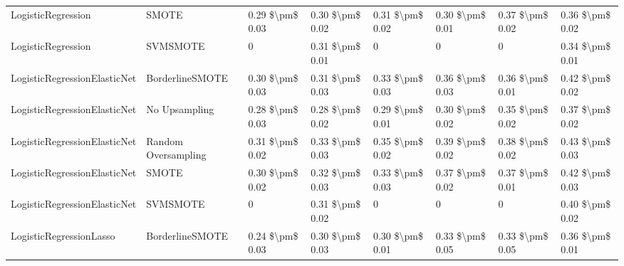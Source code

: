 \begin{tabular}{llllllll}
             LogisticRegression &                         SMOTE & 0.29 \$\textbackslash pm\$ 0.03 &           0.30 \$\textbackslash pm\$ 0.02 &       0.31 \$\textbackslash pm\$ 0.02 &        0.30 \$\textbackslash pm\$ 0.01 &                         0.37 \$\textbackslash pm\$ 0.02 &     0.36 \$\textbackslash pm\$ 0.02 \\
             LogisticRegression &                      SVMSMOTE &               0 &           0.31 \$\textbackslash pm\$ 0.01 &                     0 &                      0 &                                       0 &     0.34 \$\textbackslash pm\$ 0.01 \\
   LogisticRegressionElasticNet &               BorderlineSMOTE & 0.30 \$\textbackslash pm\$ 0.03 &           0.31 \$\textbackslash pm\$ 0.03 &       0.33 \$\textbackslash pm\$ 0.03 &        0.36 \$\textbackslash pm\$ 0.03 &                         0.36 \$\textbackslash pm\$ 0.01 &     0.42 \$\textbackslash pm\$ 0.02 \\
   LogisticRegressionElasticNet &                 No Upsampling & 0.28 \$\textbackslash pm\$ 0.03 &           0.28 \$\textbackslash pm\$ 0.02 &       0.29 \$\textbackslash pm\$ 0.01 &        0.30 \$\textbackslash pm\$ 0.02 &                         0.35 \$\textbackslash pm\$ 0.02 &     0.37 \$\textbackslash pm\$ 0.02 \\
   LogisticRegressionElasticNet &           Random Oversampling & 0.31 \$\textbackslash pm\$ 0.02 &           0.33 \$\textbackslash pm\$ 0.03 &       0.35 \$\textbackslash pm\$ 0.02 &        0.39 \$\textbackslash pm\$ 0.02 &                         0.38 \$\textbackslash pm\$ 0.02 &     0.43 \$\textbackslash pm\$ 0.03 \\
   LogisticRegressionElasticNet &                         SMOTE & 0.30 \$\textbackslash pm\$ 0.02 &           0.32 \$\textbackslash pm\$ 0.03 &       0.33 \$\textbackslash pm\$ 0.03 &        0.37 \$\textbackslash pm\$ 0.02 &                         0.37 \$\textbackslash pm\$ 0.01 &     0.42 \$\textbackslash pm\$ 0.03 \\
   LogisticRegressionElasticNet &                      SVMSMOTE &               0 &           0.31 \$\textbackslash pm\$ 0.02 &                     0 &                      0 &                                       0 &     0.40 \$\textbackslash pm\$ 0.02 \\
        LogisticRegressionLasso &               BorderlineSMOTE & 0.24 \$\textbackslash pm\$ 0.03 &           0.30 \$\textbackslash pm\$ 0.03 &       0.30 \$\textbackslash pm\$ 0.01 &        0.33 \$\textbackslash pm\$ 0.05 &                         0.33 \$\textbackslash pm\$ 0.05 &     0.36 \$\textbackslash pm\$ 0.01 \\

\end{tabular}
